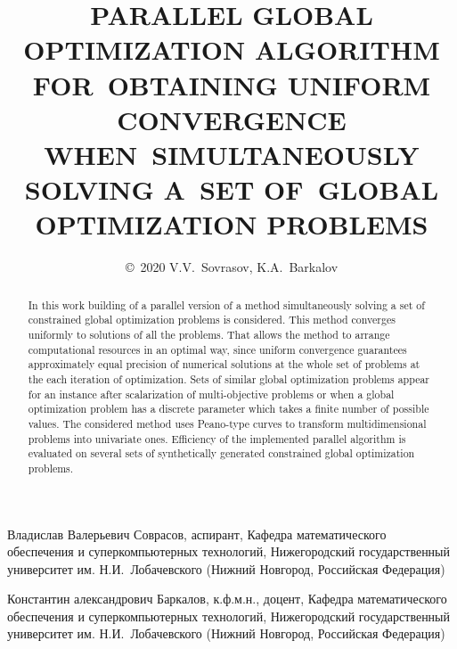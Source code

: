 \documentclass{cmi}
\begin{document}
Владислав Валерьевич Соврасов, аспирант, Кафедра математического обеспечения и
суперкомпьютерных технологий, Нижегородский государственный университет им. Н.И.~Лобачевского (Нижний Новгород, Российская Федерация)

Константин александрович Баркалов, к.ф.м.н., доцент, Кафедра математического обеспечения и
суперкомпьютерных технологий, Нижегородский государственный университет им. Н.И.~Лобачевского (Нижний Новгород, Российская Федерация)


\newpage
\classify{} %

\title{\uppercase{Parallel global optimization algorithm for~obtaining uniform convergence
when~simultaneously solving a~set of~global optimization problems}}

\author{\copyright~2020 V.V.~Sovrasov, K.A.~Barkalov}

\address{Lobachevsky State University of Nizhni Novgorod, Russia (pr. Gagarina 23(2), Nizhni Novgorod, 603022 Russia)}



\maketitle{}
\begin{abstract}%
  In this work building of a parallel version of a method simultaneously solving a set of
  constrained global optimization problems is considered. This method converges uniformly
  to solutions of all the problems. That allows the method to arrange computational resources in an
  optimal way, since uniform convergence guarantees approximately equal precision
  of numerical solutions at the whole set of problems at the each iteration of optimization.
  Sets of similar global optimization problems appear for an instance after scalarization
  of multi-objective problems or when a global optimization problem has a discrete parameter
  which takes a finite number of possible values. The considered method uses Peano-type curves
  to transform multidimensional problems into univariate ones. Efficiency of the implemented
  parallel algorithm is evaluated on several sets of synthetically generated constrained global optimization problems.

\end{abstract}
\end{document}
